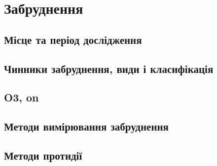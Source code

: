\chapter{Забруднення}

\section{Місце та період дослідження}

\section{Чинники забруднення, види і класифікація}

\section{O3, on}

\section{Методи вимірювання забруднення}

\section{Методи протидії}

